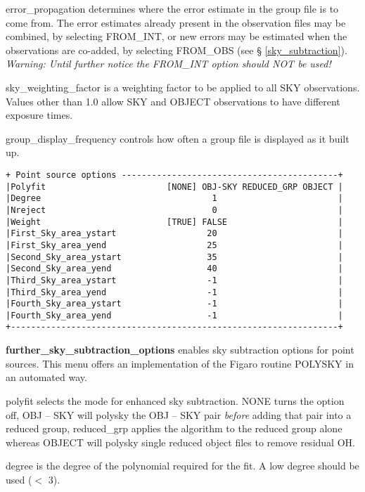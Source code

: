 {{\sf error\_propagation} determines where the error estimate in the 
group file is to come from.
The error estimates already present in the observation files may be
combined, by selecting {\sf FROM\_INT}, or new errors may be estimated when 
the observations are co-added, by selecting {\sf FROM\_OBS} (see \S 
\ref{sky_subtraction}).  {\em Warning: Until further notice the
{\sf FROM\_INT} option should NOT be used!}

{\sf sky\_weighting\_factor} is a weighting factor to be applied to all 
{\sf SKY} observations. Values other than 1.0 allow {\sf SKY} and {\sf OBJECT}
observations to have different exposure times.

{\sf group\_display\_frequency} controls how often a group file is 
displayed as it built up.

\begin{verbatim}
+ Point source options -------------------------------------------+
|Polyfit                        [NONE] OBJ-SKY REDUCED_GRP OBJECT |
|Degree                                  1                        |
|Nreject                                 0                        |
|Weight                         [TRUE] FALSE                      |
|First_Sky_area_ystart                  20                        |
|First_Sky_area_yend                    25                        |
|Second_Sky_area_ystart                 35                        |
|Second_Sky_area_yend                   40                        |
|Third_Sky_area_ystart                  -1                        |
|Third_Sky_area_yend                    -1                        |
|Fourth_Sky_area_ystart                 -1                        |
|Fourth_Sky_area_yend                   -1                        |
+-----------------------------------------------------------------+
\end{verbatim}
{\bf further\_sky\_subtraction\_options} \label{further_sky_subtraction_options}
enables sky subtraction options for point sources. 
This menu offers an implementation of the Figaro routine POLYSKY in
an automated way. 

{\sf polyfit} selects the mode for enhanced sky subtraction. {\sf NONE}
turns the option off, {\sf OBJ -- SKY} will polysky the {\sf OBJ -- SKY} pair
{\em before} adding that pair into a reduced group, {\sf reduced\_grp}
applies the algorithm to the reduced group alone whereas {\sf OBJECT}
will polysky single reduced object files to remove residual OH.

{\sf degree} is the degree of the polynomial required for the fit. A
low degree should be used ($<$ 3).

}
